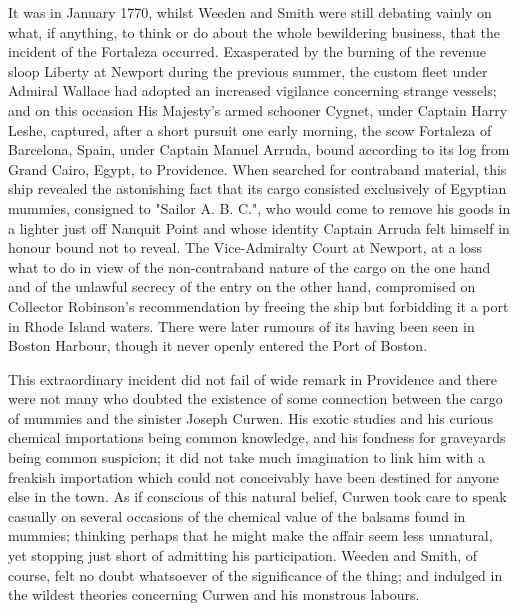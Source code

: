 It was in January 1770, whilst Weeden and Smith were still debating vainly on what, if anything, to think or do about the whole bewildering business, that the incident of the Fortaleza occurred. Exasperated by the burning of the revenue sloop Liberty at Newport during the previous summer, the custom fleet under Admiral Wallace had adopted an increased vigilance concerning strange vessels; and on this occasion His Majesty's armed schooner Cygnet, under Captain Harry Leshe, captured, after a short pursuit one early morning, the scow Fortaleza of Barcelona, Spain, under Captain Manuel Arruda, bound according to its log from Grand Cairo, Egypt, to Providence. When searched for contraband material, this ship revealed the astonishing fact that its cargo consisted exclusively of Egyptian mummies, consigned to "Sailor A. B. C.", who would come to remove his goods in a lighter just off Nanquit Point and whose identity Captain Arruda felt himself in honour bound not to reveal. The Vice-Admiralty Court at Newport, at a loss what to do in view of the non-contraband nature of the cargo on the one hand and of the unlawful secrecy of the entry on the other hand, compromised on Collector Robinson's recommendation by freeing the ship but forbidding it a port in Rhode Island waters. There were later rumours of its having been seen in Boston Harbour, though it never openly entered the Port of Boston.

This extraordinary incident did not fail of wide remark in Providence and there were not many who doubted the existence of some connection between the cargo of mummies and the sinister Joseph Curwen. His exotic studies and his curious chemical importations being common knowledge, and his fondness for graveyards being common suspicion; it did not take much imagination to link him with a freakish importation which could not conceivably have been destined for anyone else in the town. As if conscious of this natural belief, Curwen took care to speak casually on several occasions of the chemical value of the balsams found in mummies; thinking perhaps that he might make the affair seem less unnatural, yet stopping just short of admitting his participation. Weeden and Smith, of course, felt no doubt whatsoever of the significance of the thing; and indulged in the wildest theories concerning Curwen and his monstrous labours.

